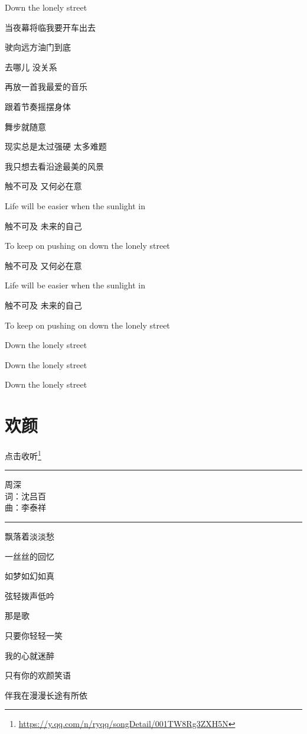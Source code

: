\documentclass[]{ctexbook}
\renewcommand{\href}[2]{#2\footnote{\url{#1}}}
\begin{document}
Down the lonely street

当夜幕将临我要开车出去

驶向远方油门到底

去哪儿 没关系

再放一首我最爱的音乐

跟着节奏摇摆身体

舞步就随意

现实总是太过强硬 太多难题

我只想去看沿途最美的风景

触不可及 又何必在意

Life will be easier when the sunlight in

触不可及 未来的自己

To keep on pushing on down the lonely street

触不可及 又何必在意

Life will be easier when the sunlight in

触不可及 未来的自己

To keep on pushing on down the lonely street

Down the lonely street

Down the lonely street

Down the lonely street

\section*{欢颜}\label{happy-face}


\href{https://y.qq.com/n/ryqq/songDetail/001TW8Rg3ZXH5N}{点击收听}

\begin{center}\rule{0.5\linewidth}{0.5pt}\end{center}

周深\\
词：沈吕百\\
曲：李泰祥

\begin{center}\rule{0.5\linewidth}{0.5pt}\end{center}

飘落着淡淡愁

一丝丝的回忆

如梦如幻如真

弦轻拨声低吟

那是歌

只要你轻轻一笑

我的心就迷醉

只有你的欢颜笑语

伴我在漫漫长途有所依
\end{document}
